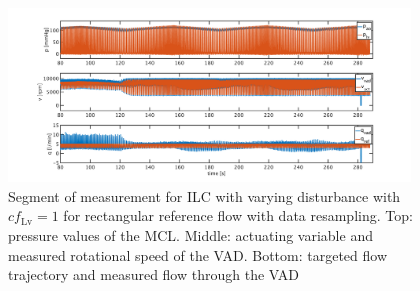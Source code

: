 \begin{figure}[ht!]
  \centering
  \includegraphics[width=0.95\textwidth]{images/chapt_5/ILC/ilc_var_dist_fix_rect.pdf}
  \caption[Segment of measurement for ILC with varying disturbance with $cf_{\mathrm{Lv}}=1$ for rectangular reference flow with data resampling]{Segment of measurement for ILC with varying disturbance with $cf_{\mathrm{Lv}}=1$ for rectangular reference flow with data resampling. Top:  pressure values of the MCL. Middle: actuating variable and measured rotational speed of the VAD. Bottom: targeted flow trajectory and measured flow through the VAD}
   \label{fig:anh_14}
\end{figure}
